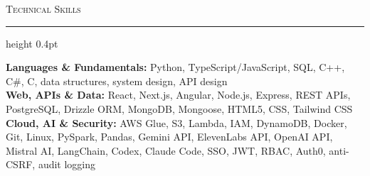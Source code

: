 \documentclass[letterpaper,11pt]{article}
\newcommand{\resumesection}[1]{%
  \par\vspace{2pt}%
  {\large\scshape #1}\par\vspace{2pt}%
  \hrule height 0.4pt\vspace{2pt}%
}
\begin{document}
\resumesection{Technical Skills}
\textbf{Languages \& Fundamentals:} Python, TypeScript/JavaScript, SQL, C++, C\#, C, data structures, system design, API design\\
\textbf{Web, APIs \& Data:} React, Next.js, Angular, Node.js, Express, REST APIs, PostgreSQL, Drizzle ORM, MongoDB, Mongoose, HTML5, CSS, Tailwind CSS\\
\textbf{Cloud, AI \& Security:} AWS Glue, S3, Lambda, IAM, DynamoDB, Docker, Git, Linux, PySpark, Pandas, Gemini API, ElevenLabs API, OpenAI API, Mistral AI, LangChain, Codex, Claude Code, SSO, JWT, RBAC, Auth0, anti-CSRF, audit logging
\end{document}
